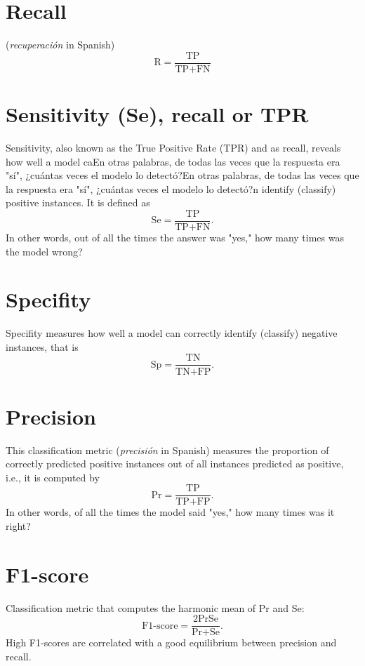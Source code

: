 \section{Recall}
(\emph{recuperación} in Spanish)
\begin{equation}
  \text{R} = \frac{\text{TP}}{\text{TP} + \text{FN}}
\end{equation}

\section{Sensitivity (Se), recall or TPR}
Sensitivity, also known as the True Positive Rate (TPR) and as recall,
reveals how well a model caEn otras palabras, de todas las veces que la respuesta era "sí", ¿cuántas veces el modelo lo detectó?En otras palabras, de todas las veces que la respuesta era "sí", ¿cuántas veces el modelo lo detectó?n identify (classify) positive
instances. It is defined as
\begin{equation}
  \text{Se} = \frac{\text{TP}}{\text{TP} + \text{FN}}.
\end{equation}
In other words, out of all the times the answer was "yes," how many times was the model wrong?

\section{Specifity}
Specifity measures how well a model can correctly identify (classify)
negative instances, that is
\begin{equation}
  \text{Sp} = \frac{\text{TN}}{\text{TN} + \text{FP}}.
\end{equation}

\section{Precision}
This classification metric (\emph{precisión} in Spanish) measures the proportion of correctly predicted positive instances out of all instances predicted as positive, i.e., it is computed by
\begin{equation}
  \text{Pr} = \frac{\text{TP}}{\text{TP} + \text{FP}}.
\end{equation}
In other words, of all the times the model said "yes," how many times was it right?

\section{F1-score}
Classification metric that computes the harmonic mean of Pr and Se:
\begin{equation}
  \text{F1-score} = \frac{2\text{Pr}\text{Se}}{\text{Pr}+\text{Se}}.
\end{equation}
High F1-scores are correlated with a good equilibrium between precision and recall.

